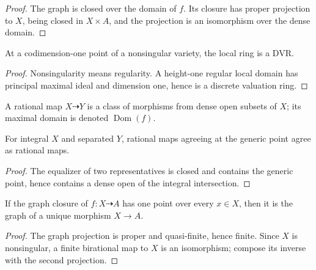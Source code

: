 \begin{proof}
  The graph is closed over the domain of \(f\).  Its closure has proper
  projection to \(X\), being closed in \(X\times A\), and the projection is an
  isomorphism over the dense domain.
\end{proof}

\begin{lemma}
  \label{mk-lem-codim-one-dvr}
  \cite{milne-av,hartshorne-ag}
  At a codimension-one point of a nonsingular variety, the local ring is a DVR.
\end{lemma}

\begin{proof}
  Nonsingularity means regularity.  A height-one regular local domain has
  principal maximal ideal and dimension one, hence is a discrete valuation ring.
\end{proof}

\begin{definition}
  \label{mk-def-rational-map}
  \cite{milne-av}
  A rational map \(X\dashrightarrow Y\) is a class of morphisms from dense
  open subsets of \(X\); its maximal domain is denoted \(\operatorname{Dom}(f)\).
\end{definition}

\begin{lemma}
  \label{mk-lem-rational-generic-agreement}
  \cite{milne-av}
  For integral \(X\) and separated \(Y\), rational maps agreeing at the
  generic point agree as rational maps.
\end{lemma}

\begin{proof}
  The equalizer of two representatives is closed and contains the generic
  point, hence contains a dense open of the integral intersection.
\end{proof}

\begin{lemma}
  \label{mk-lem-singleton-graph-extension}
  \cite{milne-av}
  If the graph closure of \(f:X\dashrightarrow A\) has one point over every
  \(x\in X\), then it is the graph of a unique morphism \(X\to A\).
\end{lemma}

\begin{proof}
  The graph projection is proper and quasi-finite, hence finite.  Since \(X\)
  is nonsingular, a finite birational map to \(X\) is an isomorphism; compose
  its inverse with the second projection.
\end{proof}


